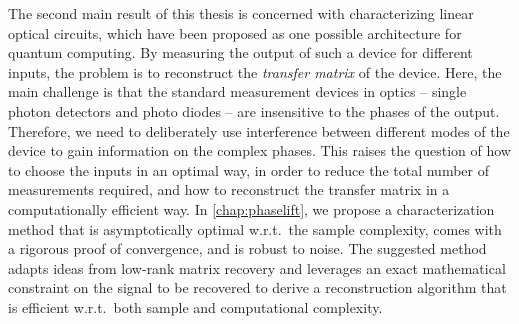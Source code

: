 The second main result of this thesis is concerned with characterizing linear optical circuits, which have been proposed as one possible architecture for quantum computing.
By measuring the output of such a device for different inputs, the problem is to reconstruct the \emph{transfer matrix} of the device.
Here, the main challenge is that the standard measurement devices in optics -- single photon detectors and photo diodes -- are insensitive to the phases of the output.
Therefore, we need to deliberately use interference between different modes of the device to gain information on the complex phases.
This raises the question of how to choose the inputs in an optimal way, in order to reduce the total number of measurements required, and how to reconstruct the transfer matrix in a computationally efficient way.
In \cref{chap:phaselift}, we propose a characterization method that is asymptotically optimal w.r.t.\ the sample complexity, comes with a rigorous proof of convergence, and is robust to noise.
The suggested method adapts ideas from low-rank matrix recovery and leverages an exact mathematical constraint on the signal to be recovered to derive a reconstruction algorithm that is efficient w.r.t.\ both sample and computational complexity.

